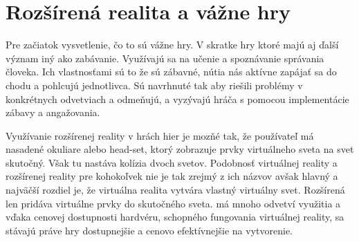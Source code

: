 \documentclass[10pt,twoside,a4paper]{article}
\begin{document}
\section{Rozšírená realita a vážne hry} \label{vz}
\par Pre začiatok vysvetlenie, čo to sú vážne hry. V skratke hry ktoré majú aj ďalší význam iný ako zabávanie. Využívajú sa na učenie a spoznávanie správania človeka. Ich vlastnosťami sú to že sú zábavné, nútia nás aktívne zapájať sa do chodu a pohlcujú jednotlivca. Sú navrhnuté tak aby riešili problémy v konkrétnych odvetviach a odmeňujú, a vyzývajú hráča s pomocou implementácie zábavy a angažovania. \par Využívanie rozšírenej reality v hrách hier je mozňé tak, že používateľ má nasadené okuliare alebo head-set, ktorý zobrazuje prvky virtuálneho sveta na svet skutočný. Však tu nastáva kolízia dvoch svetov. Podobnosť virtuálnej reality a rozšírenej reality pre kohokoľvek nie je tak zrejmý z ich názvov avšak hlavný a najväčší rozdiel je, že virtuálna realita vytvára vlastný virtuálny svet. Rozšírená len pridáva virtuálne prvky do skutočného sveta. má mnoho odvetví využitia a vďaka cenovej dostupnosti hardvéru, schopného fungovania virtuálnej reality, sa stávajú práve hry dostupnejšie a cenovo efektívnejšie na vytvorenie.
\end{document}
